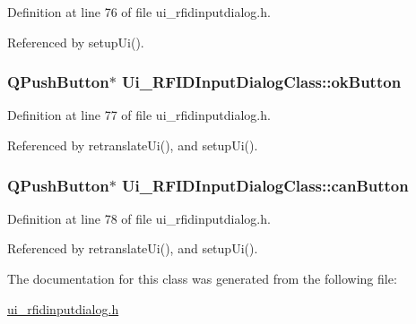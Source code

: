 Definition at line 76 of file ui\_\-rfidinputdialog.h.

Referenced by setupUi().\hypertarget{class_ui___r_f_i_d_input_dialog_class_466733b11e6270286e6388da03a41c12}{
\subsubsection[okButton]{\setlength{\rightskip}{0pt plus 5cm}QPushButton$\ast$ {\bf Ui\_\-RFIDInputDialogClass::okButton}}}
\label{class_ui___r_f_i_d_input_dialog_class_466733b11e6270286e6388da03a41c12}




Definition at line 77 of file ui\_\-rfidinputdialog.h.

Referenced by retranslateUi(), and setupUi().\hypertarget{class_ui___r_f_i_d_input_dialog_class_39433ec307d7126f4778f989d79e6607}{
\subsubsection[canButton]{\setlength{\rightskip}{0pt plus 5cm}QPushButton$\ast$ {\bf Ui\_\-RFIDInputDialogClass::canButton}}}
\label{class_ui___r_f_i_d_input_dialog_class_39433ec307d7126f4778f989d79e6607}




Definition at line 78 of file ui\_\-rfidinputdialog.h.

Referenced by retranslateUi(), and setupUi().

The documentation for this class was generated from the following file:\begin{CompactItemize}
\item 
\hyperlink{ui__rfidinputdialog_8h}{ui\_\-rfidinputdialog.h}\end{CompactItemize}
